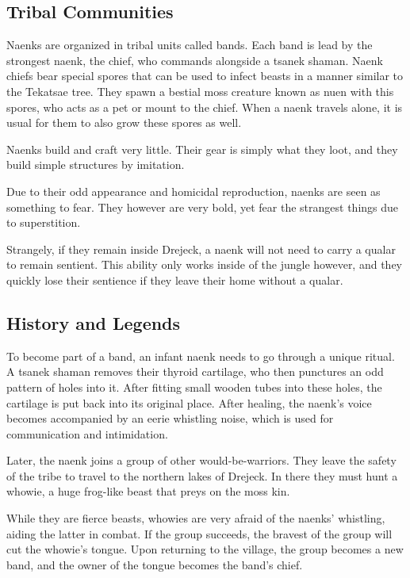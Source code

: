\subsection*{Tribal Communities}

Naenks are organized in tribal units called bands.
Each band is lead by the strongest naenk, the chief, who commands alongside a tsanek shaman.
Naenk chiefs bear special spores that can be used to infect beasts in a manner similar to the Tekatsae tree.
They spawn a bestial moss creature known as nuen with this spores, who acts as a pet or mount to the chief.
When a naenk travels alone, it is usual for them to also grow these spores as well.

Naenks build and craft very little.
Their gear is simply what they loot, and they build simple structures by imitation.

Due to their odd appearance and homicidal reproduction, naenks are seen as something to fear.
They however are very bold, yet fear the strangest things due to superstition.

Strangely, if they remain inside Drejeck, a naenk will not need to carry a qualar to remain sentient.
This ability only works inside of the jungle however, and they quickly lose their sentience if they leave their home without a qualar.

\subsection*{History and Legends}
To become part of a band, an infant naenk needs to go through a unique ritual.
A tsanek shaman removes their thyroid cartilage, who then punctures an odd pattern of holes into it.
After fitting small wooden tubes into these holes, the cartilage is put back into its original place.
After healing, the naenk's voice becomes accompanied by an eerie whistling noise, which is used for communication and intimidation.

Later, the naenk joins a group of other would-be-warriors.
They leave the safety of the tribe to travel to the northern lakes of Drejeck.
In there they must hunt a whowie, a huge frog-like beast that preys on the moss kin.

While they are fierce beasts, whowies are very afraid of the naenks' whistling, aiding the latter in combat.
If the group succeeds, the bravest of the group will cut the whowie's tongue.
Upon returning to the village, the group becomes a new band, and the owner of the tongue becomes the band's chief.

